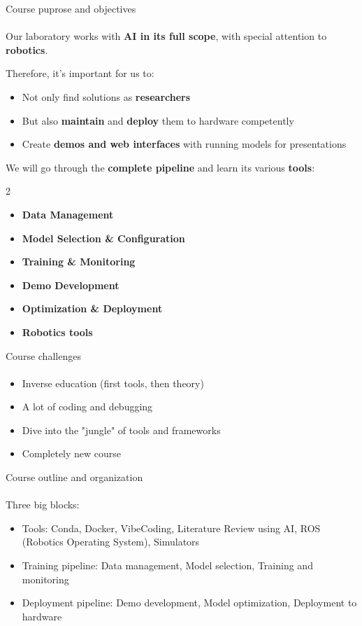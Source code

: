 \documentclass[aspectratio=169]{beamer}
\begin{document}
\begin{frame}[t]{Course puprose and objectives}
    \framesubtitle{}
    Our laboratory works with \textbf{AI in its full scope}, with special attention to \textbf{robotics}. 
    
    Therefore, it's important for us to:
    \begin{itemize}
        \item Not only find solutions as \textbf{researchers}
        \item But also \textbf{maintain} and \textbf{deploy} them to hardware competently
        \item Create \textbf{demos and web interfaces} with running models for presentations
    \end{itemize}
    \medskip
    
    We will go through the \textbf{complete pipeline} and learn its various \textbf{tools}:
    \begin{multicols}{2}
        \begin{itemize}
            \item \textbf{Data Management}
            \item \textbf{Model Selection \& Configuration}
            \item \textbf{Training \& Monitoring}
            \item \textbf{Demo Development}
            \item \textbf{Optimization \& Deployment}
            \item \textbf{Robotics tools}
        \end{itemize}
    \end{multicols}
\end{frame}

\begin{frame}[t]{Course challenges}
\framesubtitle{}
    \begin{itemize}
        \item Inverse education (first tools, then theory)
        \item A lot of coding and debugging
        \item Dive into the "jungle" of tools and frameworks
        \item Completely new course
    \end{itemize}
\end{frame}

\begin{frame}[t]{Course outline and organization}
    \framesubtitle{}
    Three big blocks:
    \begin{itemize}
        \item Tools: Conda, Docker, VibeCoding, Literature Review using AI, ROS (Robotics Operating System), Simulators
        \item Training pipeline: Data management, Model selection, Training and monitoring
        \item Deployment pipeline: Demo development, Model optimization, Deployment to hardware
    \end{itemize}
\end{frame}
\end{document}
